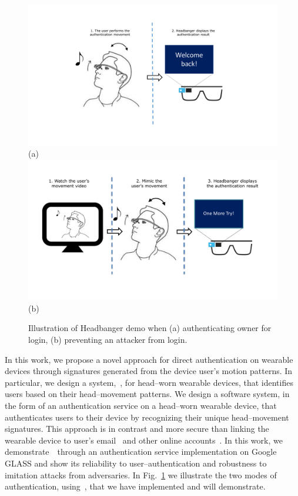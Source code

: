 \begin{figure}[t!]
	\centering
	\includegraphics [width=0.9\columnwidth]{pic/demo_illus2.pdf}\\
	\centering
	(a)\\

	\includegraphics [width=0.9\columnwidth]{pic/demo_illus.pdf}\\
	\centering
	(b)\\

\caption{Illustration of Headbanger demo when (a) authenticating owner for login, (b) preventing an attacker from login.}
\label{fig:headbanger-illustrate}
\end{figure}

In this work, we propose a novel approach for direct authentication on wearable devices through signatures generated from the device user's motion patterns. In particular, we design a system,~\systemname, for head--worn wearable devices, that identifies users based on their head--movement patterns. We design a software system, in the form of an authentication service on a head--worn wearable device, that authenticates users to their device by recognizing their unique head--movement signatures. This approach is in contrast and more secure than linking the wearable device to user's email~\cite{googleglass} and other online accounts~\cite{fitbit}. In this work, we demonstrate~\systemname~through an authentication service implementation on Google GLASS and show its reliability to user--authentication and robustness to imitation attacks from adversaries. In Fig.~\ref{fig:headbanger-illustrate} we illustrate the two modes of authentication, using~\systemname, that we have implemented and will demonstrate.

